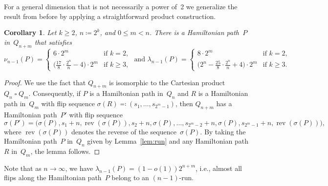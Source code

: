 \documentclass[11pt]{article}
\newtheorem{corollary}[theorem]{Corollary}
\newcommand{\ass}{\coloneqq}
\newcommand{\assr}{\eqcolon}
\DeclareMathOperator{\rev}{rev}
\begin{document}
%
For a general dimension that is not necessarily a power of~2 we generalize the result from before by applying a straightforward product construction.
%
\begin{corollary}
\label{cor:run}
Let $k\geq 2$, $n\ass 2^k$, and $0\le m <n$.
There is a Hamiltonian path~$P$ in~$Q_{n+m}$ that satisfies
\[ \nu_{n-1}(P)=\begin{cases}
               6\cdot 2^m & \text{if } k=2, \\
               \big(\frac{17}{8}\cdot\frac{2^n}{n}-4\big)\cdot 2^m & \text{if } k\ge 3,
               \end{cases} \text{   and   }
\lambda_{n-1}(P)=\begin{cases}
                 8\cdot 2^m & \text{if } k=2, \\
                 \big(2^n-\frac{25}{8}\cdot\frac{2^n}{n}+4\big)\cdot 2^m & \text{if } k\ge 3.
                 \end{cases} \]
\end{corollary}
%
\begin{proof}
We use the fact that $Q_{n+m}$ is isomorphic to the Cartesian product $Q_n \mathbin{\square} Q_m$.
Consequently, if $P$ is a Hamiltonian path in~$Q_n$ and $R$ is a Hamiltonian path in~$Q_m$ with flip sequence $\sigma(R)\assr(s_1,\dots,s_{2^m-1})$, then $Q_{n+m}$ has a Hamiltonian path~$P'$ with flip sequence
\[ \sigma(P')=\big(\sigma(P),s_1+n,\rev(\sigma(P)),s_2+n,\sigma(P),\ldots,s_{2^m-2}+n,\sigma(P),s_{2^m-1}+n,\rev(\sigma(P))\big), \]
where $\rev(\sigma(P))$ denotes the reverse of the sequence~$\sigma(P)$.
By taking the Hamiltonian path~$P$ in~$Q_n$ given by Lemma~\ref{lem:run} and any Hamiltonian path $R$ in~$Q_m$, the lemma follows.
\end{proof}
%
Note that as $n\rightarrow \infty$, we have $\lambda_{n-1}(P)=(1-o(1))2^{n+m}$, i.e., almost all flips along the Hamiltonian path~$P$ belong to an $(n-1)$-run.
%
%
\end{document}
